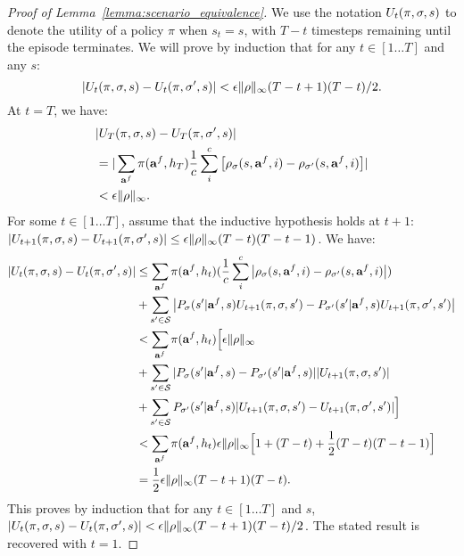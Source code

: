 \begin{proof}[Proof of Lemma~\ref{lemma:scenario_equivalence}]
        We use the notation $U_t(\pi, \sigma, s)$ to denote the utility of a policy $\pi$ when $s_t=s$, with $T-t$ timesteps remaining until the episode terminates. We will prove by induction that for any $t \in [1\dots T]$ and any $s$:
        \begin{equation}
             |U_t(\pi, \sigma, s)-U_t(\pi, \sigma', s)| < \epsilon\lVert \rho \rVert_\infty (T-t+1)(T-t)/2.
        \end{equation}
        At $t = T$, we have:
        \begin{align}
         & |U_T(\pi, \sigma, s) - U_T(\pi, \sigma', s)| \\
         &= |\sum_{\mathbf{a}^f} \pi(\mathbf{a}^f, h_T) \dfrac{1}{c}\sum_i^c\big[\rho_\sigma(s, \mathbf{a}^f, i) - \rho_{\sigma'}(s, \mathbf{a}^f, i)\big]| \\
         & < \epsilon\lVert \rho \rVert_\infty.
        \end{align}
        For some $t \in [1\dots T]$, assume that the inductive hypothesis holds at $t+1$: $|U_{t+1}(\pi, \sigma, s)-U_{t+1}(\pi, \sigma', s)| \leq \epsilon\lVert \rho \rVert_\infty(T-t)(T-t-1)$. We have:
        \begin{align}
         |U_t(\pi, \sigma, s) - U_t(\pi, \sigma', s)| & \leq \sum_{\mathbf{a}^f} \pi(\mathbf{a}^f, h_t)
         (\dfrac{1}{c}\sum_i^c \big| \rho_\sigma(s, \mathbf{a}^f, i) - \rho_{\sigma'}(s, \mathbf{a}^f, i)\big|) \\
         & + \sum_{s'\in \mathcal{S}} \big|P_\sigma(s'|\mathbf{a}^f, s) U_{t+1}(\pi, \sigma, s') - P_{\sigma'}(s'|\mathbf{a}^f, s) U_{t+1}(\pi, \sigma', s') \big| \\
         & < \sum_{\mathbf{a}^f} \pi(\mathbf{a}^f, h_t) \Big[\epsilon\lVert \rho \rVert_\infty \\
         &+ \sum_{s'\in \mathcal{S}} | P_\sigma(s'|\mathbf{a}^f, s) - P_{\sigma'}(s'|\mathbf{a}^f, s) | |U_{t+1}(\pi, \sigma, s')| \\
         &+ \sum_{s'\in \mathcal{S}}P_{\sigma'}(s'|\mathbf{a}^f, s)|U_{t+1}(\pi, \sigma, s') - U_{t+1}(\pi, \sigma', s')| \Big] \\
         & < \sum_{\mathbf{a}^f} \pi(\mathbf{a}^f, h_t) \epsilon\lVert \rho \rVert_\infty\Big[1 + (T-t) + \dfrac{1}{2}(T-t)(T-t-1) \Big] \\
         & = \dfrac{1}{2}\epsilon\lVert \rho \rVert_\infty(T-t+1)(T-t).
        \end{align}
        This proves by induction that for any $t \in [1\dots T]$ and $s$, $|U_t(\pi, \sigma, s)-U_t(\pi, \sigma', s)| < \epsilon\lVert \rho \rVert_\infty (T-t+1)(T-t)/2$.
        The stated result is recovered with $t=1$.
    \end{proof}

